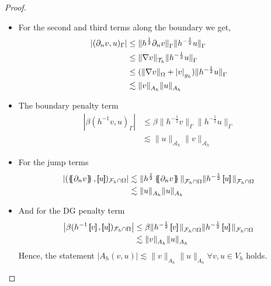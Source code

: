 \begin{proof}
\begin{enumerate}[label=\arabic*)]
\begin{itemize}
        \item For the second and third terms along the boundary we get,
            \[
                \begin{split}
                 \left\lvert ( \partial _{n} v,  u)_{\Gamma } \right\rvert & \le \|h^{\frac{1}{2}} \partial _{n}v  \|_{ \Gamma   }^{  } \| h^{-\frac{1}{2}} u  \|_{ \Gamma  }^{  }  \\
                 & \le \| \nabla v \|_{\mathcal{T}_{h}   }^{  } \|h^{-\frac{1}{2}} u \|_{ \Gamma    }^{  } \\
 &  \le ( \| \nabla v \|_{ \Omega  }^{  } + \left\lvert  v  \right\rvert _{g_{h}} ) \|h^{-\frac{1}{2}} u \|_{ \Gamma    }^{  } \\
                 & \lesssim   \| v \|_{A_{h}   }^{  } \| u \|_{ A_{h}    }^{  }
                \end{split}
            \]

        \item The boundary penalty term
            \[
                \begin{split}
                    \left\lvert\beta ( h^{-1} v,u)_{\Gamma }  \right\rvert  & \le \beta \| h^{-\frac{1}{2}} v \|_{\Gamma   }^{  } \| h^{-\frac{1}{2}} u \|_{\Gamma   }^{  } \\
                                                                            &\lesssim \| u \|_{\mathcal{A}_{h}   }^{  }\| v \|_{\mathcal{A}_{h}   }^{  }
                \end{split}
            \]

        \item For the jump terms \[
                \begin{split}
                    \left\lvert( \mean{ \partial _{n} v }  , \jump{ u }  ) _{\mathcal{F} _{h} \cap \Omega }  \right\rvert &\lesssim  \| h^{\frac{1}{2}} \mean{ \partial _{n} v }   \|_{ \mathcal{F}_{h}\cap \Omega   }^{  } \|h^{-\frac{1}{2}} \jump{ u }   \|_{ \mathcal{F}_{h}\cap
                    \Omega   }^{  } \\
&\lesssim  \| u   \|_{ A_{h}    }^{  } \|  u    \|_{ A_{h}   }^{  }
                \end{split}
        \]

    \item And for the DG penalty term
        \[
            \begin{split}
         \left\lvert \beta ( h^{-1} \jump{ v }  ,
         \jump{ u }  )_{\mathcal{F}_{h}\cap \Omega  } \right\rvert &\le  \beta \| h^{-\frac{1}{2}    }\jump{ v } \|_{ \mathcal{F}_{h} \cap \Omega  }^{  }\| h^{-\frac{1}{2}    }\jump{ u } \|_{\mathcal{F}_{h} \cap \Omega   }^{  } \\
    &\lesssim \| v \|_{A_{h}  }^{  } \| u \|_{A_{h}  }^{  }
            \end{split}
        \]
        Hence, the statement $\left\lvert A_{h}( v,u) \right\rvert \lesssim \| v \|_{A_{h}  }^{  }     \| u \|_{A_{h}  }^{  }  \forall v,u \in V_{h} $ holds.
    \end{itemize}


\end{enumerate}
\end{proof}
